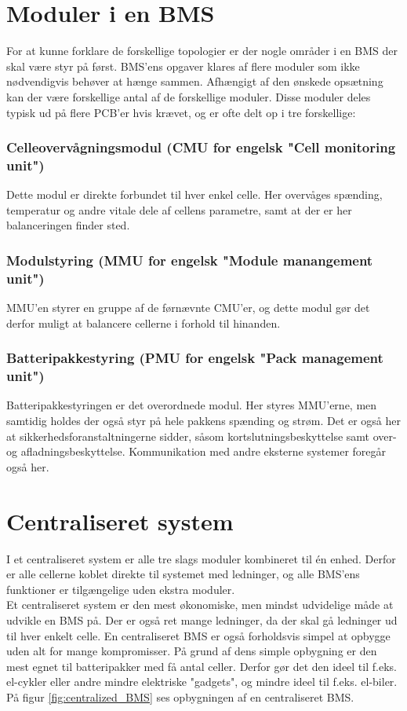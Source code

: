 \section{Moduler i en BMS}
For at kunne forklare de forskellige topologier er der nogle områder i en BMS der skal være styr på først. BMS'ens opgaver klares af flere moduler som ikke nødvendigvis behøver at hænge sammen. Afhængigt af den ønskede opsætning kan der være forskellige antal af de forskellige moduler. Disse moduler deles typisk ud på flere PCB'er hvis krævet, og er ofte delt op i tre forskellige: 

\subsubsection{Celleovervågningsmodul (CMU for engelsk "Cell monitoring unit")}
Dette modul er direkte forbundet til hver enkel celle. Her overvåges spænding, temperatur og andre vitale dele af cellens parametre, samt at der er her balanceringen finder sted. 

\subsubsection{Modulstyring (MMU for engelsk "Module manangement unit")}
MMU'en styrer en gruppe af de førnævnte CMU'er, og dette modul gør det derfor muligt at balancere cellerne i forhold til hinanden. 

\subsubsection{Batteripakkestyring (PMU for engelsk "Pack management unit")}
Batteripakkestyringen er det overordnede modul. Her styres MMU'erne, men samtidig holdes der også styr på hele pakkens spænding og strøm. Det er også her at sikkerhedsforanstaltningerne sidder, såsom kortslutningsbeskyttelse samt over- og afladningsbeskyttelse. Kommunikation med andre eksterne systemer foregår også her. 

\section{Centraliseret system}
I et centraliseret system er alle tre slags moduler kombineret til én enhed. Derfor er alle cellerne koblet direkte til systemet med ledninger, og alle BMS'ens funktioner er tilgængelige uden ekstra moduler. \\

Et centraliseret system er den mest økonomiske, men mindst udvidelige måde at udvikle en BMS på. Der er også ret mange ledninger, da der skal gå ledninger ud til hver enkelt celle. En centraliseret BMS er også forholdsvis simpel at opbygge uden alt for mange kompromisser. På grund af dens simple opbygning er den mest egnet til batteripakker med få antal celler. Derfor gør det den ideel til f.eks. el-cykler eller andre mindre elektriske "gadgets", og mindre ideel til f.eks. el-biler. På figur \ref{fig:centralized_BMS} ses opbygningen af en centraliseret BMS. \\

